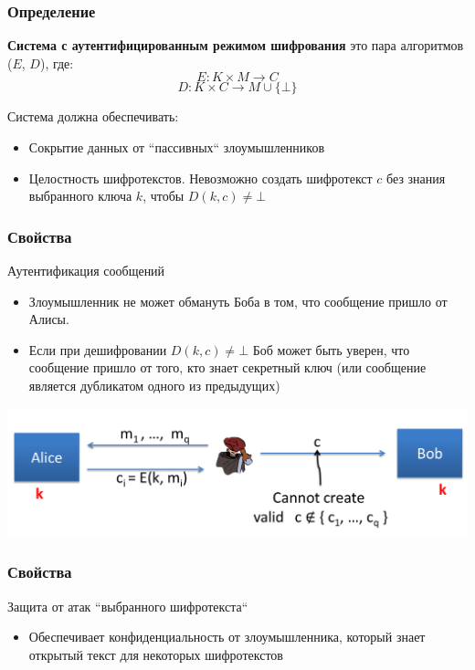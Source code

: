 \documentclass{beamer}
\begin{document}
\begin{frame}
  \frametitle{Определение}

  \textbf{Система с аутентифицированным режимом шифрования} это пара алгоритмов ($E$, $D$), где:
  \[ E: K \times M \rightarrow C \]
  \[ D: K \times C \rightarrow M \cup \{\bot\} \]

  Система должна обеспечивать:
  \begin{itemize}
    \item{Сокрытие данных от ``пассивных`` злоумышленников}
    \item{Целостность шифротекстов. Невозможно создать шифротекст $c$ без знания выбранного ключа $k$, чтобы $D(k, c) \neq \bot$}
  \end{itemize}
\end{frame}

\begin{frame}
  \frametitle{Свойства}

  Аутентификация сообщений

  \begin{itemize}
    \item{Злоумышленник не может обмануть Боба в том, что сообщение пришло от Алисы.}
    \item{Если при дешифровании $D(k, c) \neq \bot$ Боб может быть уверен, что
      сообщение пришло от того, кто знает секретный ключ (или сообщение является дубликатом одного из предыдущих)}
  \end{itemize}

  \includegraphics[width=\linewidth]{./img/png/authenticity.png}
\end{frame}

\begin{frame}
  \frametitle{Свойства}

  Защита от атак ``выбранного шифротекста``

  \begin{itemize}
    \item{Обеспечивает конфиденциальность от злоумышленника,
      который знает открытый текст для некоторых шифротекстов}
  \end{itemize}

\end{frame}
\end{document}

